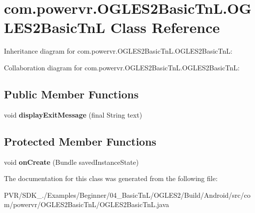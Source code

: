 \hypertarget{classcom_1_1powervr_1_1_o_g_l_e_s2_basic_tn_l_1_1_o_g_l_e_s2_basic_tn_l}{\section{com.\+powervr.\+O\+G\+L\+E\+S2\+Basic\+Tn\+L.\+O\+G\+L\+E\+S2\+Basic\+Tn\+L Class Reference}
\label{classcom_1_1powervr_1_1_o_g_l_e_s2_basic_tn_l_1_1_o_g_l_e_s2_basic_tn_l}
}


Inheritance diagram for com.\+powervr.\+O\+G\+L\+E\+S2\+Basic\+Tn\+L.\+O\+G\+L\+E\+S2\+Basic\+Tn\+L\+:


Collaboration diagram for com.\+powervr.\+O\+G\+L\+E\+S2\+Basic\+Tn\+L.\+O\+G\+L\+E\+S2\+Basic\+Tn\+L\+:
\subsection*{Public Member Functions}
\begin{DoxyCompactItemize}
\item 
\hypertarget{classcom_1_1powervr_1_1_o_g_l_e_s2_basic_tn_l_1_1_o_g_l_e_s2_basic_tn_l_adb03d6bbdf5e3478e587c9f332298dc5}{void {\bfseries display\+Exit\+Message} (final String text)}\label{classcom_1_1powervr_1_1_o_g_l_e_s2_basic_tn_l_1_1_o_g_l_e_s2_basic_tn_l_adb03d6bbdf5e3478e587c9f332298dc5}

\end{DoxyCompactItemize}
\subsection*{Protected Member Functions}
\begin{DoxyCompactItemize}
\item 
\hypertarget{classcom_1_1powervr_1_1_o_g_l_e_s2_basic_tn_l_1_1_o_g_l_e_s2_basic_tn_l_a2259d1a51518717a9189d46e61e0dd68}{void {\bfseries on\+Create} (Bundle saved\+Instance\+State)}\label{classcom_1_1powervr_1_1_o_g_l_e_s2_basic_tn_l_1_1_o_g_l_e_s2_basic_tn_l_a2259d1a51518717a9189d46e61e0dd68}

\end{DoxyCompactItemize}


The documentation for this class was generated from the following file\+:\begin{DoxyCompactItemize}
\item 
P\+V\+R/\+S\+D\+K\+\_./\+Examples/\+Beginner/04\+\_\+\+Basic\+Tn\+L/\+O\+G\+L\+E\+S2/\+Build/\+Android/src/com/powervr/\+O\+G\+L\+E\+S2\+Basic\+Tn\+L/O\+G\+L\+E\+S2\+Basic\+Tn\+L.\+java\end{DoxyCompactItemize}
